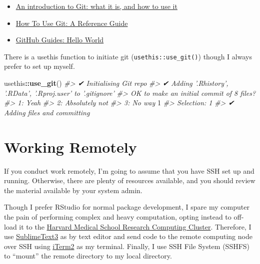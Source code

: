 \documentclass[]{book}
\newenvironment{Shaded}{\begin{snugshade}}{\end{snugshade}}
\newcommand{\CommentTok}[1]{\textcolor[rgb]{0.56,0.35,0.01}{\textit{#1}}}
\newcommand{\DecValTok}[1]{\textcolor[rgb]{0.00,0.00,0.81}{#1}}
\newcommand{\KeywordTok}[1]{\textcolor[rgb]{0.13,0.29,0.53}{\textbf{#1}}}
\newcommand{\NormalTok}[1]{#1}
\newcommand{\OperatorTok}[1]{\textcolor[rgb]{0.81,0.36,0.00}{\textbf{#1}}}
\providecommand{\tightlist}{%
  \setlength{\itemsep}{0pt}\setlength{\parskip}{0pt}}
\begin{document}
\begin{itemize}
\tightlist
\item
  \href{https://medium.freecodecamp.org/what-is-git-and-how-to-use-it-c341b049ae61}{An introduction to Git: what it is, and how to use it}
\item
  \href{https://www.digitalocean.com/community/tutorials/how-to-use-git-a-reference-guide}{How To Use Git: A Reference Guide}
\item
  \href{https://guides.github.com/activities/hello-world/}{GitHub Guides: Hello World}
\end{itemize}

There is a usethis function to initiate git (\texttt{usethis::use\_git()}) though I always prefer to set up myself.

\begin{Shaded}
\begin{Highlighting}[]
\NormalTok{usethis}\OperatorTok{::}\KeywordTok{use_git}\NormalTok{()}
\CommentTok{#> ✔ Initialising Git repo}
\CommentTok{#> ✔ Adding '.Rhistory', '.RData', '.Rproj.user' to '.gitignore'}
\CommentTok{#> OK to make an initial commit of 8 files?}
\CommentTok{#> 1: Yeah}
\CommentTok{#> 2: Absolutely not}
\CommentTok{#> 3: No way}
\DecValTok{1}
\CommentTok{#> Selection: 1}
\CommentTok{#> ✔ Adding files and committing}
\end{Highlighting}
\end{Shaded}

\hypertarget{working-remotely}{%
\section{Working Remotely}\label{working-remotely}}

If you conduct work remotely, I'm going to assume that you have SSH set up and running. Otherwise, there are plenty of resources available, and you should review the material available by your system admin.

Though I prefer RStudio for normal package development, I spare my computer the pain of performing complex and heavy computation, opting instead to off-load it to the \href{https://rc.hms.harvard.edu}{Harvard Medical School Research Computing Cluster}. Therefore, I use \href{https://www.sublimetext.com}{SublimeText3} as by text editor and send code to the remote computing node over SSH using \href{https://iterm2colorschemes.com}{iTerm2} as my terminal. Finally, I use SSH File System (SSHFS) to ``mount'' the remote directory to my local directory.
\end{document}
